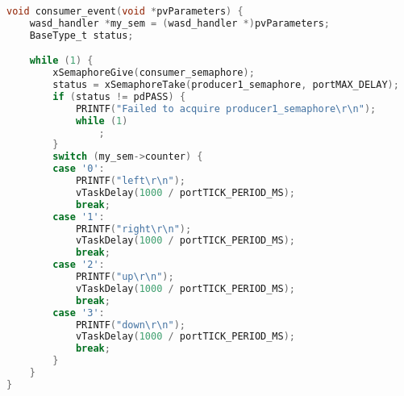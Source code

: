 \begin{lstlisting}[language=c,caption=Problem 4.2 Consumer Task, label=list:p4_2_cons]
void consumer_event(void *pvParameters) {
    wasd_handler *my_sem = (wasd_handler *)pvParameters;
    BaseType_t status;

    while (1) {
        xSemaphoreGive(consumer_semaphore);
        status = xSemaphoreTake(producer1_semaphore, portMAX_DELAY);
        if (status != pdPASS) {
            PRINTF("Failed to acquire producer1_semaphore\r\n");
            while (1)
                ;
        }
        switch (my_sem->counter) {
        case '0':
            PRINTF("left\r\n");
            vTaskDelay(1000 / portTICK_PERIOD_MS);
            break;
        case '1':
            PRINTF("right\r\n");
            vTaskDelay(1000 / portTICK_PERIOD_MS);
            break;
        case '2':
            PRINTF("up\r\n");
            vTaskDelay(1000 / portTICK_PERIOD_MS);
            break;
        case '3':
            PRINTF("down\r\n");
            vTaskDelay(1000 / portTICK_PERIOD_MS);
            break;
        }
    }
}
\end{lstlisting}
